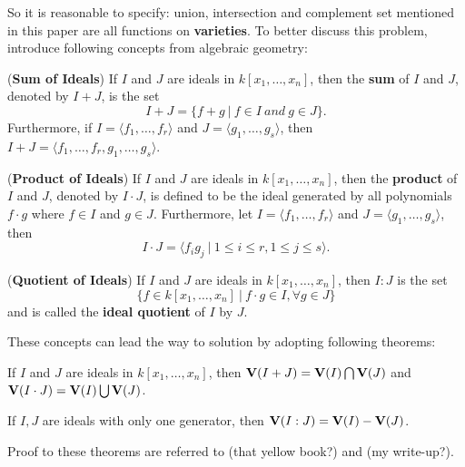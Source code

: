 So it is reasonable to specify: union, intersection and complement set mentioned in this paper are all functions on \textbf{varieties}.
To better discuss this problem, introduce following concepts from algebraic geometry:
\begin{Definition}
\label{def:sum}
({\bf Sum of Ideals}) If $I$ and $J$ are ideals in $k[x_1, \dots, x_n]$, then the 
{\bf sum} of $I$ and $J$, denoted by $I + J$, is the set
  \begin{equation}
  I + J = \{f + g\ |\ f \in I \ and\  g \in J\}.
  \end{equation}
Furthermore, if $I = \langle f_1, \dots, f_r\rangle$ and 
$J = \langle g_1, \dots, g_s\rangle$, then 
$I + J = \langle f_1, \dots, f_r, g_1, \dots, g_s\rangle$.
\end{Definition}
\begin{Definition}
\label{def:prod}
({\bf Product of Ideals}) If $I$ and $J$ are ideals in $k[x_1, \dots, x_n]$, then the
{\bf product} of $I$ and $J$, denoted by $I \cdot J$, is defined to be the ideal generated 
by all polynomials $f \cdot g$ where $f \in I$ and $g \in J$. Furthermore, let
$I = \langle f_1, \dots, f_r\rangle$ and $J = \langle g_1, \dots, g_s\rangle$, then
  \begin{equation}
  I \cdot J = \langle f_ig_j\ |\ 1 \leq i \leq r, 1 \leq j \leq s\rangle .
  \end{equation}
\end{Definition}
\begin{Definition}
({\bf Quotient of Ideals}) If $I$ and $J$ are ideals in $k[x_1, \dots, x_n]$, then $I:J$
is the set
  \begin{equation}
  \{f \in k[x_1, \dots, x_n]\ |\ f\cdot g \in I, \forall g \in J\}
  \end{equation}
and is called the {\bf ideal quotient} of $I$ by $J$.
\end{Definition}
These concepts can lead the way to solution by adopting following theorems:
\begin{Theorem}
\label{thm:unionintersect}
If $I$ and $J$ are ideals in $k[x_1, \dots, x_n]$, then ${\bf V}(I + J) = {\bf V}(I)
\bigcap {\bf V}(J)$ and ${\bf V}(I \cdot J) = {\bf V}(I) \bigcup {\bf V}(J)$.
\end{Theorem}
\begin{Theorem}
\label{thm:quotient}
If $I, J$ are ideals with only one generator, then ${\bf V}(I:J) ={\bf V}(I) - {\bf V}(J)$.
\end{Theorem}
Proof to these theorems are referred to (that yellow book?) and (my write-up?).

